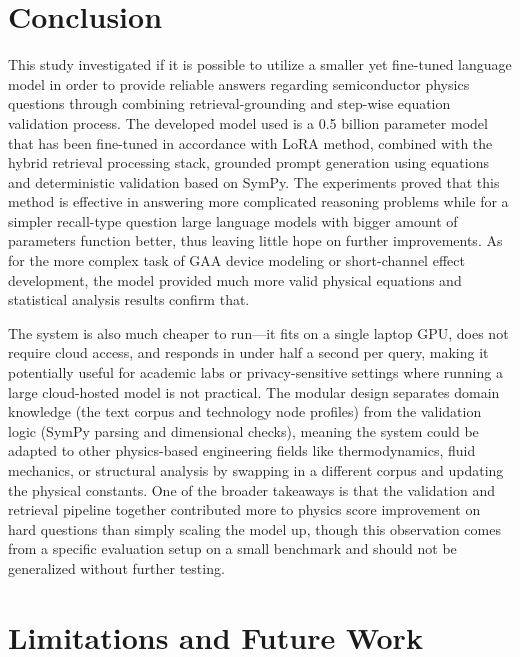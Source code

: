\documentclass[a4paper,fleqn]{cas-sc}
\begin{document}
\FloatBarrier
\section{Conclusion}
This study investigated if it is possible to utilize a smaller yet fine-tuned language model in order to provide reliable answers regarding semiconductor physics questions through combining retrieval-grounding and step-wise equation validation process. The developed model used is a 0.5 billion parameter model that has been fine-tuned in accordance with LoRA method, combined with the hybrid retrieval processing stack, grounded prompt generation using equations and deterministic validation based on SymPy. The experiments proved that this method is effective in answering more complicated reasoning problems while for a simpler recall-type question large language models with bigger amount of parameters function better, thus leaving little hope on further improvements. As for the more complex task of GAA device modeling or short-channel effect development, the model provided much more valid physical equations and statistical analysis results confirm that.

The system is also much cheaper to run---it fits on a single laptop GPU, does not require cloud access, and responds in under half a second per query, making it potentially useful for academic labs or privacy-sensitive settings where running a large cloud-hosted model is not practical. The modular design separates domain knowledge (the text corpus and technology node profiles) from the validation logic (SymPy parsing and dimensional checks), meaning the system could be adapted to other physics-based engineering fields like thermodynamics, fluid mechanics, or structural analysis by swapping in a different corpus and updating the physical constants. One of the broader takeaways is that the validation and retrieval pipeline together contributed more to physics score improvement on hard questions than simply scaling the model up, though this observation comes from a specific evaluation setup on a small benchmark and should not be generalized without further testing.

\section{Limitations and Future Work}
\end{document}
